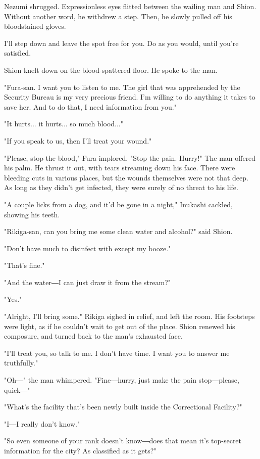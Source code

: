 Nezumi shrugged. Expressionless eyes flitted between the wailing man and
Shion. Without another word, he withdrew a step. Then, he slowly pulled
off his bloodstained gloves.

I'll step down and leave the spot free for you. Do as you would, until
you're satisfied.

Shion knelt down on the blood-spattered floor. He spoke to the man.

"Fura-san. I want you to listen to me. The girl that was apprehended by
the Security Bureau is my very precious friend. I'm willing to do
anything it takes to save her. And to do that, I need information from
you."

"It hurts... it hurts... so much blood..."

"If you speak to us, then I'll treat your wound."

"Please, stop the blood," Fura implored. "Stop the pain. Hurry!" The man
offered his palm. He thrust it out, with tears streaming down his face.
There were bleeding cuts in various places, but the wounds themselves
were not that deep. As long as they didn't get infected, they were
surely of no threat to his life.

"A couple licks from a dog, and it'd be gone in a night," Inukashi
cackled, showing his teeth.

"Rikiga-san, can you bring me some clean water and alcohol?" said Shion.

"Don't have much to disinfect with except my booze."

"That's fine."

"And the water―I can just draw it from the stream?"

"Yes."

"Alright, I'll bring some." Rikiga sighed in relief, and left the room.
His footsteps were light, as if he couldn't wait to get out of the
place. Shion renewed his composure, and turned back to the man's
exhausted face.

"I'll treat you, so talk to me. I don't have time. I want you to answer
me truthfully."

"Oh―" the man whimpered. "Fine―hurry, just make the pain stop―please,
quick―"

"What's the facility that's been newly built inside the Correctional
Facility?"

"I―I really don't know."

"So even someone of your rank doesn't know―does that mean it's
top-secret information for the city? As classified as it gets?"

